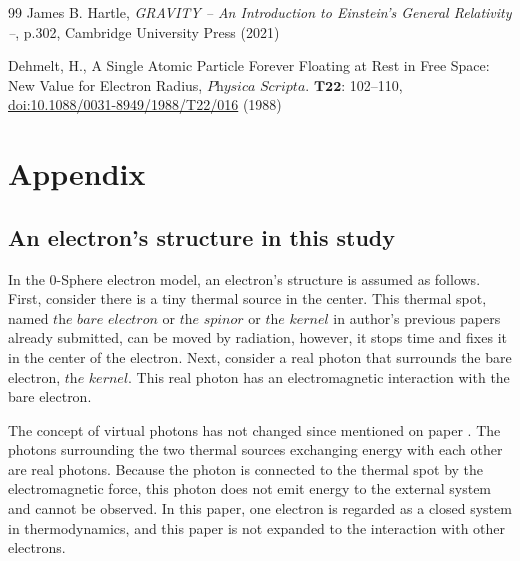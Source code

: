 \documentclass[10.5pt]{article}
\numberwithin{equation}{section}
\begin{document}
\begin{thebibliography}{99}
     James B. Hartle, \textit{GRAVITY -- An Introduction to Einstein's General Relativity --}, p.302, Cambridge University Press (2021)

     Dehmelt, H., A Single Atomic Particle Forever Floating at Rest in Free Space: New Value for Electron Radius, $\textit{Physica Scripta}$. $\textbf{T22}$: 102--110, \href{https://iopscience.iop.org/article/10.1088/0031-8949/1988/T22/016}{doi:10.1088/0031-8949/1988/T22/016} (1988)


\end{thebibliography}

\clearpage

\section{Appendix}
\label{Appendix}


\subsection{An electron’s structure in this study}
\label{An electron’s structure in this study}

        In the 0-Sphere electron model, an electron's structure is assumed as follows. First, consider there is a tiny thermal source in the center. This thermal spot, named $\textit{the bare electron}$ or $\textit{the spinor}$ or $\textit{the kernel}$ in author's previous papers already submitted, can be moved by radiation, however, it stops time and fixes it in the center of the electron. Next, consider a real photon that surrounds the bare electron, $\textit{the kernel}$. This real photon has an electromagnetic interaction with the bare electron.

        The concept of virtual photons has not changed since mentioned on paper \cite{Hanamura1}. The photons surrounding the two thermal sources exchanging energy with each other are real photons. Because the photon is connected to the thermal spot by the electromagnetic force, this photon does not emit energy to the external system and cannot be observed. In this paper, one electron is regarded as a closed system in thermodynamics, and this paper is not expanded to the interaction with other electrons.
        
\end{document}
